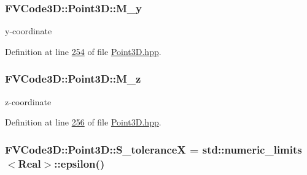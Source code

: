 \subsubsection[{\texorpdfstring{M\+\_\+y}{M_y}}]{ F\+V\+Code3\+D\+::\+Point3\+D\+::\+M\+\_\+y\hspace{0.3cm}{\ttfamily [private]}}\hypertarget{classFVCode3D_1_1Point3D_a087a884a5ed2eafb804db5f0a2f9aea6}{}\label{classFVCode3D_1_1Point3D_a087a884a5ed2eafb804db5f0a2f9aea6}


y-\/coordinate 



Definition at line \hyperlink{Point3D_8hpp_source_l00254}{254} of file \hyperlink{Point3D_8hpp_source}{Point3\+D.\+hpp}.

\subsubsection[{\texorpdfstring{M\+\_\+z}{M_z}}]{ F\+V\+Code3\+D\+::\+Point3\+D\+::\+M\+\_\+z\hspace{0.3cm}{\ttfamily [private]}}\hypertarget{classFVCode3D_1_1Point3D_ae335813a9743fd9406322e77e395823d}{}\label{classFVCode3D_1_1Point3D_ae335813a9743fd9406322e77e395823d}


z-\/coordinate 



Definition at line \hyperlink{Point3D_8hpp_source_l00256}{256} of file \hyperlink{Point3D_8hpp_source}{Point3\+D.\+hpp}.

\subsubsection[{\texorpdfstring{S\+\_\+toleranceX}{S_toleranceX}}]{ F\+V\+Code3\+D\+::\+Point3\+D\+::\+S\+\_\+toleranceX = std\+::numeric\+\_\+limits$<${\bf Real}$>$\+::epsilon()\hspace{0.3cm}{\ttfamily [static]}}\hypertarget{classFVCode3D_1_1Point3D_a970c57d27a188366fb4a30fd08b98b7a}{}\label{classFVCode3D_1_1Point3D_a970c57d27a188366fb4a30fd08b98b7a}


